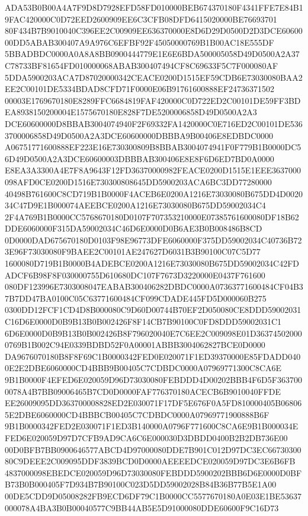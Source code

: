 \documentclass[UTF8,fontset=fandol,zihao=-4,a4paper]{ctexart}
\begin{document}
{{ADA53B0B00A4A7F9D8D7928EFD58FD010000BEB674370180F4341FFE7E84B19FAC420000C0D72EED2600909EE6C3CFB08DFD6415020000BE76693701
80F434B7B9010040C396EE2C00909EE636370000E8D6D29D0500D2D3DCE6060000DD5ABAB300407A9A976C6EFBF92F45050000769B1B00AC18E555DF
5BBADBDC0000A0A8A8BB0900444779E1E6E6BDA500005058D49D0500A2A37C78733BF81654FD010000068ABAB300407494CF8C69633F5C7F000080AF
5DDA5900203ACA7D87020000342CEACE0200D1515EF59CDB6E73030080BAA2EE2C00101DE5334BDAD8CFD71F0000E06B91761600888EF24736371502
00003E1769670180E8289FFC6684819FAF420000C0D722ED2C00101DE59FF3BDEA8938150200004E1575670180E828F7DE5200006858D49D0500A2A3
DCE60600000D8BBAB3004074940F2F69332FA1420000C0E716ED2C00101DE5363700006858D49D0500A2A3DCE60600000DBBBA9B00406E8EDBDC0000
A06751771600888EF223E16E730300809B8BBAB3004074941F0F779B1B0000DC56D49D0500A2A3DCE60600003DBBBAB300406E8E8F6D6ED7BD0A0000
E8EA3A3300A4E7F8A9643F12FD36370000982FEACE0200D1515E1EEE3637000098AFD0CE0200D1516E730300808645DD5900203ACA6BC3DD77280000
40498B761600C8CD719B1B0000F4ACEB6E0200A1216E73030080B675DD4D002034C47D9E1B000074AEEBCE0200A1216E73030080B675DD59002034C4
2F4A769B1B0000CC5768670180D0107F707353210000E07385761600080DF18B62DDE6060000F315DA59002034C46D6E0000D0B6AE3B0B008486B8CD
0D0000DAD675670180D0103F98E96773DFE6060000F375DD59002034C40736B723E96F73030080F9BAEE2C00101AE247627D6031B3B90100C07C5D77
1600080D719B1B0000B4ADEBCE0200A1216E73030080B675DD59002034C42FDADCF6B98F8F030000755D610680DC107F7673D3220000E0437F761600
080DF123996E7303008047EABAB300406282DBDC0000A07363771600484CF04B37B7DD47BA0100C05C63771600484CF099CDADE445FD5D000060B275
0300DD12FCF1CD4D8B000080C9D60D00744B70EF2D050080CE8DDD59002031C16D6E0000D0B9B13B0B002426F8F14CB7B90100C0FD8DDD59002031C1
6D6E0000D0B9B13B0B002426B8F796020040E7C6EE2C009098E01D363745020000769B1B002C94E0339BDBD52F0A00001ABBB3004062827BCE0D0000
DA9676070180B8F8F69C1B0000342FED0E020071F1ED39370000E85FDADD0400E2E2DBE6060000CD4BBB9B00405C7CDBDC0000A07969771300C8CA6E
9B1B0000F4EFED6E020059D96D73030080FEBDDD4D00202BBB4F6D5F3637000078A4B7BB09006465B7CD0D0000FAF776370180ACECB6B9010040FFDE
EE26009095DD363700008828ED2E030071F17DF5E676F0A5FD810000405B068065E2DBE6060000CD4BBBCB00405C7CDBDC0000A07969771900888B6F
9B1B0000342FED2E030071F1ED3B140000A0796F771600C8CA6E9B1B000034EFED6E020059D97D7CFB9AD9CA6C6E000030D3DBDD0400B2B2DB736E00
00D0BFB7BB0900646577ABCD4D97000080DDE7B901C012D97DC3EC6673030080C9DEEE2C009095DDF3839BCD0D0000AEEEEDCE020059D97DC3E6B6FB
4837000098EBEDCE020059D96D73030080FEBDDD5900202BBB6D6E0000D0BFB73B0B000405F7D934B7B90100C023D5DD59002028B84B36B77B5E1A00
00DE5CDD9D05008282FB9ECD6DF79C1B0000CC5577670180A0E03E1BE53637000078A4BA3B0B00040577C9BB44AB5E5D91000080DDE60600F9C16D73
}}
\end{document}
